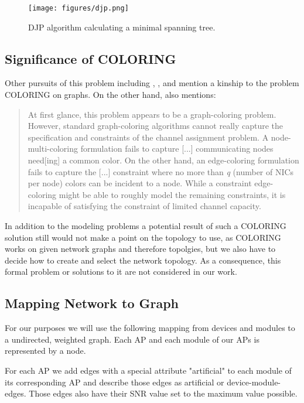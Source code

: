     \begin{figure}[th!]
      \centering
      \texttt{[image: figures/djp.png]}
      \caption{\ac{DJP} algorithm calculating a minimal spanning tree.}
      \label{fig:djp}
    \end{figure}
    
  \subsection{Significance of COLORING}
    Other pursuits of this problem including \cite{BFS-CA}, \cite{CTA}, \cite{caa_tricky} and \cite{katzela} mention a kinship to the problem COLORING on graphs.
    On the other hand, \cite{caa_tricky} also mentions:
    
    \begin{quote}
      At first glance, this problem appears to be a graph-coloring problem. However, standard graph-coloring algorithms cannot really capture the specification and constraints 
      of the channel assignment problem. A node-multi-coloring formulation fails to capture [...] communicating nodes need[ing] a common color. On the other hand,
      an edge-coloring formulation fails to capture the [...] constraint where no more than \textit{q} (number of NICs per node) colors can be incident to a node.
      While a constraint edge-coloring might be able to roughly model the remaining constraints, it is incapable of satisfying the constraint of limited channel capacity.
    \end{quote}
    
    In addition to the modeling problems a potential result of such a COLORING solution still would not make a point on the topology to use,
    as COLORING works on given network graphs and therefore topolgies, but we also have to decide how to create and select the network topology.
    As a consequence, this formal problem or solutions to it are not considered in our work.
    
  \subsection{Mapping Network to Graph}
    For our purposes we will use the following mapping from devices and modules to a undirected, weighted graph.
    Each \ac{AP} and each module of our APs is represented by a node.
    
    For each \ac{AP} we add edges with a special attribute "artificial" 
    to each module of its corresponding \ac{AP} and describe those edges as artificial or device-module-edges.
    Those edges also have their \ac{SNR} value set to the maximum value possible. 
    
